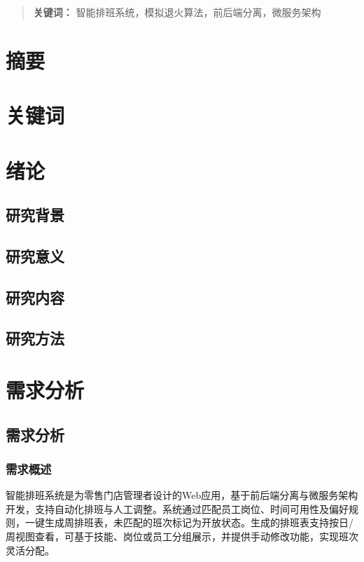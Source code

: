 \documentclass{ctexart}
\begin{document}
\begin{abstract}
\par\textbf{关键词：} %
智能排班系统，模拟退火算法，前后端分离，微服务架构
\end{abstract}

\section*{摘要}
\section*{关键词}

\section{绪论}
\subsection{研究背景}
\subsection{研究意义}
\subsection{研究内容}
\subsection{研究方法}

\section{需求分析}
\subsection{需求分析}
\subsubsection{需求概述}
智能排班系统是为零售门店管理者设计的Web应用，基于前后端分离与微服务架构开发，支持自动化排班与人工调整。系统通过匹配员工岗位、时间可用性及偏好规则，一键生成周排班表，未匹配的班次标记为开放状态。生成的排班表支持按日/周视图查看，可基于技能、岗位或员工分组展示，并提供手动修改功能，实现班次灵活分配。
\end{document}
